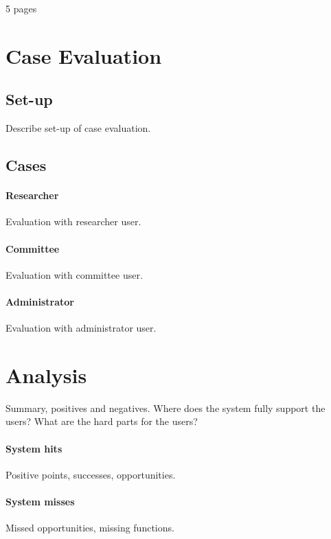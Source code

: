 5 pages

\section{Case Evaluation}
\subsection{Set-up}
Describe set-up of case evaluation.
\subsection{Cases}
\paragraph{Researcher}
Evaluation with researcher user.
\paragraph{Committee}
Evaluation with committee user.
\paragraph{Administrator}
Evaluation with administrator user.

\section{Analysis}
Summary, positives and negatives. Where does the system fully support the users? What are the hard parts for the users?
\paragraph{System hits}
Positive points, successes, opportunities.
\paragraph{System misses}
Missed opportunities, missing functions.